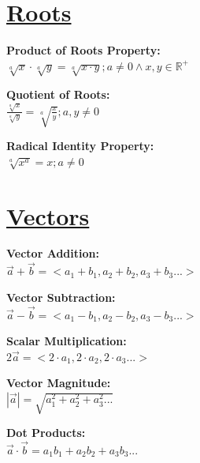 \documentclass[12pt]{article}
\begin{document}
\section*{\underline{\textbf{Roots}}}
\begin{minipage}{\textwidth}
    \textbf{Product of Roots Property:}
    \\ \( \displaystyle\sqrt[a]{x} \cdot \displaystyle\sqrt[a]{y} = \displaystyle\sqrt[a]{x \cdot y} ; a \ne 0 \land x, y \in \mathbb{R}^+ \)
\end{minipage}
\begin{minipage}{\textwidth}
    \textbf{Quotient of Roots:}
    \\ \( \displaystyle\frac{ \displaystyle\sqrt[a]{x} }{ \displaystyle\sqrt[a]{y} } = \displaystyle\sqrt[a]{\displaystyle\frac{ x }{ y }} ; a, y \ne 0 \)
\end{minipage}
\begin{minipage}{\textwidth}
    \textbf{Radical Identity Property:}
    \\ \( \displaystyle\sqrt[a]{x^a} = x ; a \ne 0 \)
\end{minipage}



\section*{\underline{\textbf{Vectors}}}
\begin{minipage}{\textwidth}
    \textbf{Vector Addition:}
    \\ \( \vec{ a } + \vec{ b } = < a_1 + b_1, a_2 + b_2, a_3 + b_3... > \)
\end{minipage}
\begin{minipage}{\textwidth}
    \textbf{Vector Subtraction:}
    \\ \( \vec{ a } - \vec{ b } = < a_1 - b_1, a_2 - b_2, a_3 - b_3... > \)
\end{minipage}
\begin{minipage}{\textwidth}
    \textbf{Scalar Multiplication:}
    \\ \( 2 \vec{ a } = < 2 \cdot a_1, 2 \cdot a_2, 2 \cdot a_3... > \)
\end{minipage}
\begin{minipage}{\textwidth}
    \textbf{Vector Magnitude:}
    \\ \( | \vec{ a } | = \sqrt{ a_1^2 + a_2^2 + a_3^2... } \)
\end{minipage}
\begin{minipage}{\textwidth}
    \textbf{Dot Products:}
    \\ \( \vec{ a } \cdot \vec{ b } = a_1 b_1 + a_2 b_2 + a_3 b_3... \)
\end{minipage}
\end{document}

